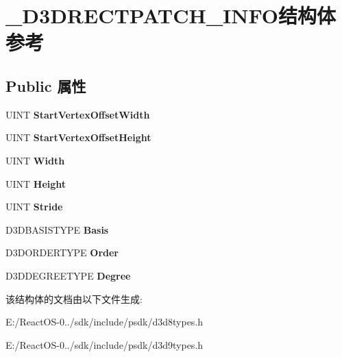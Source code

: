 \hypertarget{struct___d3_d_r_e_c_t_p_a_t_c_h___i_n_f_o}{}\section{\+\_\+\+D3\+D\+R\+E\+C\+T\+P\+A\+T\+C\+H\+\_\+\+I\+N\+F\+O结构体 参考}
\label{struct___d3_d_r_e_c_t_p_a_t_c_h___i_n_f_o}
\subsection*{Public 属性}
\begin{DoxyCompactItemize}
\item 
\mbox{\label{struct___d3_d_r_e_c_t_p_a_t_c_h___i_n_f_o_adbd850900939a48cbd12ff5222fafbfc}} 
U\+I\+NT {\bfseries Start\+Vertex\+Offset\+Width}
\item 
\mbox{\label{struct___d3_d_r_e_c_t_p_a_t_c_h___i_n_f_o_a5144a53f4eac1a3ed3995c491d5082df}} 
U\+I\+NT {\bfseries Start\+Vertex\+Offset\+Height}
\item 
\mbox{\label{struct___d3_d_r_e_c_t_p_a_t_c_h___i_n_f_o_aca77debf4114accd6a46b55987daca29}} 
U\+I\+NT {\bfseries Width}
\item 
\mbox{\label{struct___d3_d_r_e_c_t_p_a_t_c_h___i_n_f_o_aa6619ff2368b190378ea5dc05e158e58}} 
U\+I\+NT {\bfseries Height}
\item 
\mbox{\label{struct___d3_d_r_e_c_t_p_a_t_c_h___i_n_f_o_a546cca04d06aface008982c8724a2db6}} 
U\+I\+NT {\bfseries Stride}
\item 
\mbox{\label{struct___d3_d_r_e_c_t_p_a_t_c_h___i_n_f_o_ab39efb1284064a3ce96dd91d720d4439}} 
D3\+D\+B\+A\+S\+I\+S\+T\+Y\+PE {\bfseries Basis}
\item 
\mbox{\label{struct___d3_d_r_e_c_t_p_a_t_c_h___i_n_f_o_af53b8a7479a31b99456ac3ad3eb6b837}} 
D3\+D\+O\+R\+D\+E\+R\+T\+Y\+PE {\bfseries Order}
\item 
\mbox{\label{struct___d3_d_r_e_c_t_p_a_t_c_h___i_n_f_o_a4e2ac50b769ddb2bdf995fc438066b9e}} 
D3\+D\+D\+E\+G\+R\+E\+E\+T\+Y\+PE {\bfseries Degree}
\end{DoxyCompactItemize}


该结构体的文档由以下文件生成\+:\begin{DoxyCompactItemize}
\item 
E\+:/\+React\+O\+S-\/0../sdk/include/psdk/d3d8types.\+h\item 
E\+:/\+React\+O\+S-\/0../sdk/include/psdk/d3d9types.\+h\end{DoxyCompactItemize}
